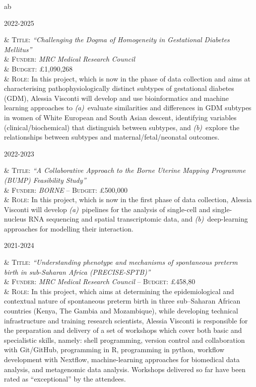 \documentclass[a4paper,10pt]{article}
\newenvironment{singletablelist}
{	\vspace{-0.2cm}
	\begin{longtable}[!h]{ab}}{\end{longtable}
}
\newcommand{\stlist}[2]{
	\hspace{-3cm}
	\noindent
	\begin{minipage}{0.24\textwidth}
	\begin{flushright}
	\textsc{#1}
	\end{flushright}
	\end{minipage}
	& #2\\[0.2cm]
}
\begin{document}
\begin{singletablelist}
	
    \stlist{2022-2025}{ 
		  \textsc{Title:} \emph{``Challenging the Dogma of Homogeneity in Gestational Diabetes Mellitus''}\\
		& \textsc{Funder:} \emph{MRC Medical Research Council}\\
		& \textsc{Budget:} £1,090,268\\
		& \textsc{Role:} In this project, which is now in the phase of data collection and aims at characterising pathophysiologically distinct subtypes of gestational diabetes (GDM), Alessia Visconti will develop and use bioinformatics and machine learning approaches to \emph{(a)}~evaluate similarities and differences in GDM subtypes in women of White European and South Asian descent, identifying variables (clinical/biochemical) that distinguish between subtypes, and \emph{(b)}~explore the relationships between subtypes and maternal/fetal/neonatal outcomes.}
	 
	\stlist{2022-2023}{
		  \textsc{Title:} \emph{``A Collaborative Approach to the Borne Uterine Mapping Programme (BUMP) Feasibility Study''}\\
		& \textsc{Funder:} \emph{BORNE} -- \textsc{Budget:} £500,000\\
		& \textsc{Role:} In this project, which is now in the first phase of data collection, Alessia Visconti will develop \emph{(a)}~pipelines for the analysis of single-cell and single-nucleus RNA sequencing and spatial transcriptomic data, and \emph{(b)}~deep-learning approaches for modelling their interaction. 
	} 

	\stlist{2021-2024}{ 
		  \textsc{Title:} \emph{``Understanding phenotype and mechanisms of spontaneous preterm birth in sub-Saharan Africa (PRECISE-SPTB)''}\\
		& \textsc{Funder:} \emph{MRC Medical Research Council} -- \textsc{Budget:} £458,80\\
		& \textsc{Role:} In this project, which aims at determining the epidemiological and contextual nature of spontaneous preterm birth in three sub–Saharan African countries (Kenya, The Gambia and Mozambique), while developing technical infrastructure and training research scientists, Alessia Visconti is responsible for the preparation and delivery of a set of workshops which cover both basic and specialistic skills, namely: shell programming, version control and collaboration with Git/GitHub, programming in R, programming in python, workflow development with Nextflow, machine-learning approaches for biomedical data analysis, and metagenomic data analysis. Workshops delivered so far have been rated as “exceptional” by the attendees.
		}
		

\end{singletablelist}
\end{document}
